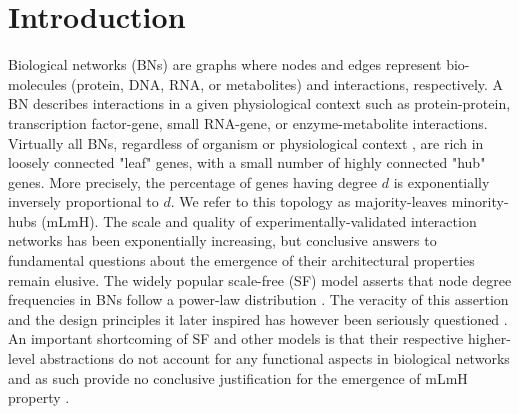 %

%
\section{Introduction} \label{intro}
Biological networks (BNs) are graphs where nodes and edges represent bio-molecules (protein, DNA, RNA, or metabolites) 
and interactions, respectively. 
A BN describes interactions in a given physiological context such as protein-protein, transcription factor-gene, small RNA-gene, or enzyme-metabolite interactions. 
Virtually all BNs, regardless of organism or physiological context \cite{yu_high-quality_2008, simonis_empirically_2009, consortium_evidence_2011, neph_circuitry_2012, rajagopala_binary_2014, vinayagam_integrating_2014, stergachis_conservation_2014, yang_widespread_2016}, are rich in loosely connected "leaf" genes, 
with a small number of highly connected "hub" genes.  More precisely, the percentage of genes having degree $d$ is exponentially inversely 
proportional to $d$.
We refer to this topology as majority-leaves minority-hubs (mLmH). 
The scale \cite{rolland_proteome-scale_2014} and quality \cite{yang_widespread_2016} of experimentally-validated interaction networks has been exponentially 
increasing, but conclusive answers to fundamental questions
about the emergence of their architectural properties remain elusive. 
The widely popular \cite{perc_matthew_2014} scale-free (SF) model asserts that node degree frequencies in BNs follow a power-law distribution \cite{barabasi_emergence_1999}.
The veracity of this assertion and the design principles it later inspired \cite{albert_error_2000, barabasi_network_2004}
has however been seriously questioned \cite{fox_keller_revisiting_2005, tanaka_protein_2005, khanin_how_2006, clauset_power-law_2009, lima-mendez_powerful_2009}.		
An important shortcoming of SF and other models \cite{bak_self-organized_1988} is that their respective higher-level abstractions do not account 
for any functional aspects 
in biological networks and as such provide no conclusive justification for the emergence of mLmH property \cite{alderson_contrasting_2010}. 
